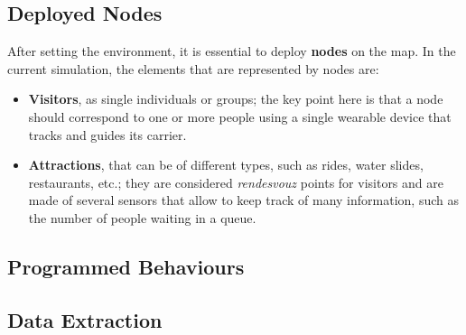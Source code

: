 \subsection{Deployed Nodes}
After setting the environment, it is essential to deploy \textbf{nodes} on the map. In the current simulation, the elements that are represented by nodes are:
\begin{itemize}
    \item \textbf{Visitors}, as single individuals or groups; the key point here is that a node should correspond to one or more people using a single wearable device that tracks and guides its carrier.
    \item \textbf{Attractions}, that can be of different types, such as rides, water slides, restaurants, etc.; they are considered \textit{rendesvouz} points for visitors and are made of several sensors that allow to keep track of many information, such as the number of people waiting in a queue.
\end{itemize}

\subsection{Programmed Behaviours}

\subsection{Data Extraction}